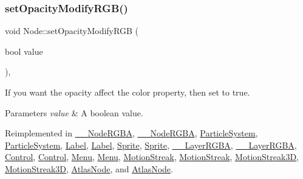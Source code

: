 \subsubsection{\texorpdfstring{set\+Opacity\+Modify\+R\+G\+B()}{setOpacityModifyRGB()}\hspace{0.1cm}{\footnotesize\ttfamily [1/2]}}
{\footnotesize\ttfamily void Node\+::set\+Opacity\+Modify\+R\+GB (\begin{DoxyParamCaption}\item[{bool}]{value }\end{DoxyParamCaption})\hspace{0.3cm}{\ttfamily [inline]}, {\ttfamily [virtual]}}

If you want the opacity affect the color property, then set to true. 
\begin{DoxyParams}{Parameters}
{\em value} & A boolean value. \\
\hline
\end{DoxyParams}


Reimplemented in \hyperlink{class____NodeRGBA_a2baa7449894e58c0bc78e749058b9c0e}{\+\_\+\+\_\+\+Node\+R\+G\+BA}, \hyperlink{class____NodeRGBA_a2baa7449894e58c0bc78e749058b9c0e}{\+\_\+\+\_\+\+Node\+R\+G\+BA}, \hyperlink{classParticleSystem_a2c5a931c70aaa80e3fc098ec0aaf9827}{Particle\+System}, \hyperlink{classParticleSystem_a2c5a931c70aaa80e3fc098ec0aaf9827}{Particle\+System}, \hyperlink{classLabel_a29fe05b89ed819988763ae013ca8fe48}{Label}, \hyperlink{classLabel_ab548565b1faa8449ced97d96a591e955}{Label}, \hyperlink{classSprite_a4b86bd0afb6fa3bb3ed5521041800458}{Sprite}, \hyperlink{classSprite_adf41c2705eb6b1317a14c469c84da78c}{Sprite}, \hyperlink{class____LayerRGBA_a04037a60b1a1f9d5ba2760252ad2da35}{\+\_\+\+\_\+\+Layer\+R\+G\+BA}, \hyperlink{class____LayerRGBA_a04037a60b1a1f9d5ba2760252ad2da35}{\+\_\+\+\_\+\+Layer\+R\+G\+BA}, \hyperlink{classControl_afc69bf17ee302a8efd9db70d5bb4c5b7}{Control}, \hyperlink{classControl_ad2bebed567807e1e309513666f67ad5e}{Control}, \hyperlink{classMenu_ae2979f44049f67f2a2411cb3901842ef}{Menu}, \hyperlink{classMenu_a7dc62dd40fb8b6cd4addee5fb38cb6b9}{Menu}, \hyperlink{classMotionStreak_a03e92253595f528d79528bbb4be1b2ad}{Motion\+Streak}, \hyperlink{classMotionStreak_aa140ca21b82d41fbe8c0ba08d8060c3b}{Motion\+Streak}, \hyperlink{classMotionStreak3D_ad201e04b841b5fb15fea56bfd6b9cb03}{Motion\+Streak3D}, \hyperlink{classMotionStreak3D_ac4ef49b3087c63f5cea40efe91d4f271}{Motion\+Streak3D}, \hyperlink{classAtlasNode_ab9dacc4ad5e4701ff0a531605f2d1f11}{Atlas\+Node}, and \hyperlink{classAtlasNode_adb5151b64bb92b157133f9efb07124a8}{Atlas\+Node}.

